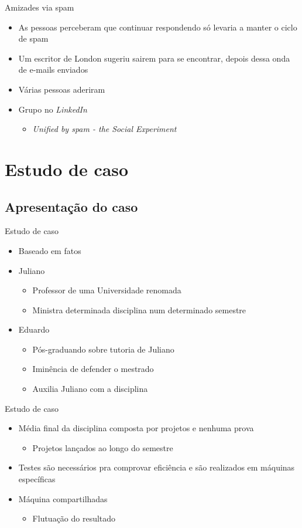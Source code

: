 \documentclass[dvipdfm]{beamer}
\begin{document}
\begin{frame}{Amizades via spam}
	\begin{itemize}
		\item As pessoas perceberam que continuar respondendo só levaria a manter o ciclo de spam
		\item Um escritor de London sugeriu sairem para se encontrar, depois dessa onda de e-mails enviados
		\item Várias pessoas aderiram
		\item Grupo no \emph{LinkedIn}
		\begin{itemize}
			\item \emph{Unified by spam - the Social Experiment}
		\end{itemize}
	\end{itemize}
\end{frame}

\section{Estudo de caso}
\subsection{Apresentação do caso}
\begin{frame}{Estudo de caso}
\begin{itemize}
	\item Baseado em fatos
	\item Juliano
	\begin{itemize}
		\item Professor de uma Universidade renomada
		\item Ministra determinada disciplina num determinado semestre
	\end{itemize}
	\item Eduardo
	\begin{itemize}
		\item Pós-graduando sobre tutoria de Juliano
		\item Iminência de defender o mestrado
		\item Auxilia Juliano com a disciplina
	\end{itemize}
\end{itemize}
\end{frame}

\begin{frame}{Estudo de caso}
\begin{itemize}
	\item Média final da disciplina composta por projetos e nenhuma prova
	\begin{itemize}
		\item Projetos lançados ao longo do semestre
	\end{itemize}
	\item Testes são necessários pra comprovar eficiência e são realizados em máquinas específicas
	\item Máquina compartilhadas
	\begin{itemize}
		\item Flutuação do resultado
	\end{itemize}
\end{itemize}
\end{frame}
\end{document}
